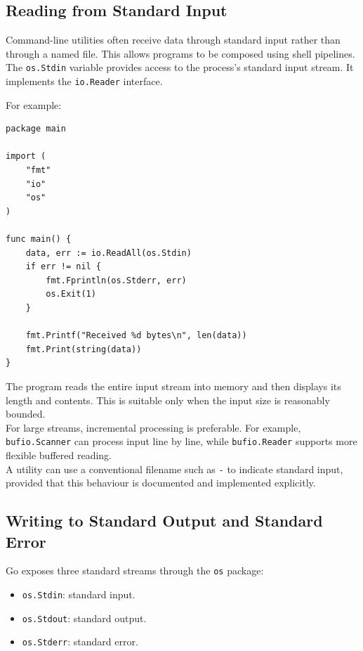 \subsection{Reading from Standard Input}

Command-line utilities often receive data through standard input rather than through a named file. This allows programs to be composed using shell pipelines.\\

The \texttt{os.Stdin} variable provides access to the process's standard input stream. It implements the \texttt{io.Reader} interface.

For example:

\begin{lstlisting}
package main

import (
    "fmt"
    "io"
    "os"
)

func main() {
    data, err := io.ReadAll(os.Stdin)
    if err != nil {
        fmt.Fprintln(os.Stderr, err)
        os.Exit(1)
    }

    fmt.Printf("Received %d bytes\n", len(data))
    fmt.Print(string(data))
}
\end{lstlisting}

The program reads the entire input stream into memory and then displays its length and contents. This is suitable only when the input size is reasonably bounded.\\

For large streams, incremental processing is preferable. For example, \texttt{bufio.Scanner} can process input line by line, while \texttt{bufio.Reader} supports more flexible buffered reading.\\

A utility can use a conventional filename such as \texttt{-} to indicate standard input, provided that this behaviour is documented and implemented explicitly.\\

\subsection{Writing to Standard Output and Standard Error}

Go exposes three standard streams through the \texttt{os} package:

\begin{itemize}
    \item \texttt{os.Stdin}: standard input.
    \item \texttt{os.Stdout}: standard output.
    \item \texttt{os.Stderr}: standard error.
\end{itemize}

